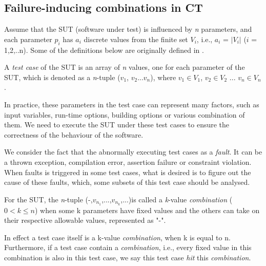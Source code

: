 \documentclass{sig-alternate}
\begin{document}
\subsection{Failure-inducing combinations in CT}

Assume that the SUT (software under test) is influenced by \emph{n} parameters, and each parameter $p_{i}$ has $a_{i}$ discrete values from the finite set $V_{i}$, i.e., $a_{i}$ = $|V_{i}|$ ($i$ = 1,2,..n). Some of the definitions below are originally defined in \cite{nie2011survey}.

\begin{definition}
A \emph{test case} of the SUT is an array of \emph{n} values, one for each parameter of the SUT, which is denoted as a \emph{n}-tuple ($v_{1}$, $v_{2}$...$v_{n}$), where $v_{1}\in V_{1}$, $v_{2} \in V_{2}$ ... $v_{n} \in V_{n}$.
\end{definition}

In practice, these parameters in the test case can represent many factors, such as input variables, run-time options, building options or various combination of them. We need to execute the SUT under these test cases to ensure the correctness of the behaviour of the software.

We consider the fact that the abnormally executing test cases as a \emph{fault}. It can be a thrown exception, compilation error, assertion failure or constraint violation. When faults is triggered in some test cases, what is desired is to figure out the cause of these faults, which, some subsets of this test case should be analysed.



\begin{definition}
For the SUT, the \emph{n}-tuple (-,$v_{n_{1}}$,...,$v_{n_{k}}$,...)is called a \emph{k}-value \emph{combination} ($0 < k \leq n $) when some k parameters have fixed values and the others can take on their respective allowable values, represented as "-".

In effect a test case itself is a k-value \emph{combination}, when k is equal to n. Furthermore, if a test case contain a \emph{combination}, i.e., every fixed value in this combination is also in this test case, we say this test case \emph{hit} this \emph{combination}.
\end{definition}
\end{document}
